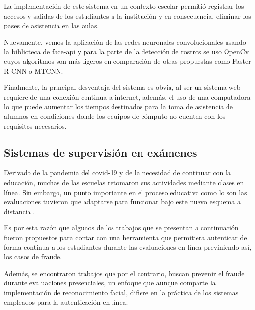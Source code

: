 \begin{itemize}
	La implementación de este sistema en un contexto escolar permitió registrar los accesos y salidas de los estudiantes a la institución y en consecuencia, eliminar los pases de asistencia en las aulas.
	
	Nuevamente, vemos la aplicación de las redes neuronales convolucionales usando la biblioteca de face-api y para la parte de la detección de rostros se uso OpenCv cuyos algoritmos son más ligeros en comparación de otras propuestas como Faster R-CNN o MTCNN.
	
	Finalmente, la principal desventaja del sistema es obvia, al ser un sistema web requiere de una conexión continua a internet, además, el uso de una computadora lo que puede aumentar los tiempos destinados para la toma de asistencia de alumnos en condiciones donde los equipos de cómputo no cuenten con los requisitos necesarios.
	
	
	
	
\end{itemize}


\subsection{Sistemas de supervisión en exámenes}

Derivado de la pandemia del covid-19 y de la necesidad de continuar con la educación, muchas de las escuelas retomaron sus actividades mediante clases en línea. Sin embargo, un punto importante en el proceso educativo como lo son las evaluaciones tuvieron que adaptarse para funcionar bajo este nuevo esquema a distancia \cite{EA0}.

Es por esta razón que algunos de los trabajos que se presentan a continuación fueron propuestos para contar con una herramienta que permitiera autenticar de forma continua a los estudiantes durante las evaluaciones en línea previniendo así, los casos de fraude.

Además, se encontraron trabajos que por el contrario, buscan prevenir el fraude durante evaluaciones presenciales, un enfoque que aunque comparte la implementación de reconocimiento facial, difiere en la práctica de los sistemas empleados para la autenticación en línea.
 

